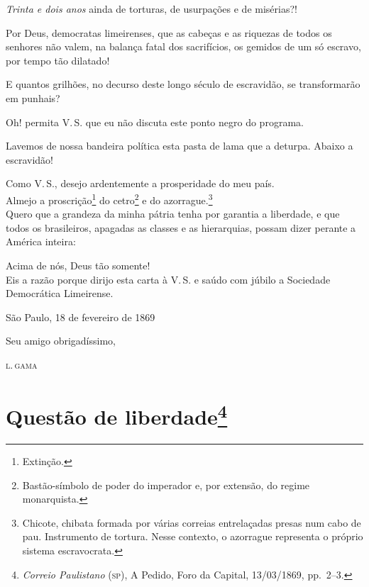 \emph{Trinta e dois anos} ainda de torturas, de usurpações e de
misérias?!

Por Deus, democratas limeirenses, que as cabeças e as riquezas de todos
os senhores não valem, na balança fatal dos sacrifícios, os gemidos de
um só escravo, por tempo tão dilatado!

E quantos grilhões, no decurso deste longo século de escravidão, se
transformarão em punhais?

Oh! permita V.\,S. que eu não discuta este ponto negro do programa.

Lavemos de nossa bandeira política esta pasta de lama que a deturpa.
Abaixo a escravidão!

\noindent\dotfill

Como V.\,S., desejo ardentemente a prosperidade do meu país.\\
Almejo a proscrição\footnote{Extinção.} do cetro\footnote{
  Bastão-símbolo de poder do imperador e, por extensão, do regime
  monarquista.} e do azorrague.\footnote{Chicote, chibata formada por
  várias correias entrelaçadas presas num cabo de pau. Instrumento de
  tortura. Nesse contexto, o azorrague representa o próprio sistema
  escravocrata.}\\
Quero que a grandeza da minha pátria tenha por garantia a liberdade, e
que todos os brasileiros, apagadas as classes e as hierarquias, possam
dizer perante a América inteira:

Acima de nós, Deus tão somente!\\
Eis a razão porque dirijo esta carta à V.\,S. e saúdo com júbilo a
Sociedade Democrática Limeirense.

\begin{flushright}
São Paulo, 18 de fevereiro de 1869

Seu amigo obrigadíssimo,

\textsc{l.\,gama}
\end{flushright}

\chapter{Questão de liberdade\footnote{\emph{Correio Paulistano} (\textsc{sp}),
  A Pedido, Foro da Capital, 13/03/1869, pp.~2--3.}}

